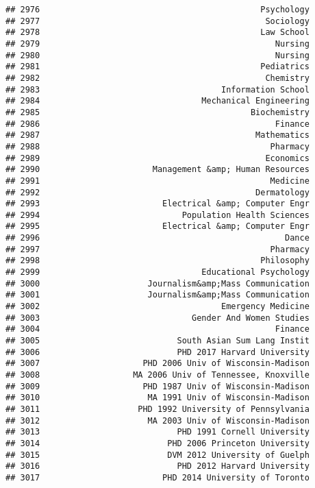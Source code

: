 \documentclass[
]{article}
\begin{document}
\begin{verbatim}
## 2976                                             Psychology
## 2977                                              Sociology
## 2978                                             Law School
## 2979                                                Nursing
## 2980                                                Nursing
## 2981                                             Pediatrics
## 2982                                              Chemistry
## 2983                                     Information School
## 2984                                 Mechanical Engineering
## 2985                                           Biochemistry
## 2986                                                Finance
## 2987                                            Mathematics
## 2988                                               Pharmacy
## 2989                                              Economics
## 2990                       Management &amp; Human Resources
## 2991                                               Medicine
## 2992                                            Dermatology
## 2993                         Electrical &amp; Computer Engr
## 2994                             Population Health Sciences
## 2995                         Electrical &amp; Computer Engr
## 2996                                                  Dance
## 2997                                               Pharmacy
## 2998                                             Philosophy
## 2999                                 Educational Psychology
## 3000                      Journalism&amp;Mass Communication
## 3001                      Journalism&amp;Mass Communication
## 3002                                     Emergency Medicine
## 3003                               Gender And Women Studies
## 3004                                                Finance
## 3005                            South Asian Sum Lang Instit
## 3006                            PHD 2017 Harvard University
## 3007                     PHD 2006 Univ of Wisconsin-Madison
## 3008                   MA 2006 Univ of Tennessee, Knoxville
## 3009                     PHD 1987 Univ of Wisconsin-Madison
## 3010                      MA 1991 Univ of Wisconsin-Madison
## 3011                    PHD 1992 University of Pennsylvania
## 3012                      MA 2003 Univ of Wisconsin-Madison
## 3013                            PHD 1991 Cornell University
## 3014                          PHD 2006 Princeton University
## 3015                          DVM 2012 University of Guelph
## 3016                            PHD 2012 Harvard University
## 3017                         PHD 2014 University of Toronto

\end{verbatim}
\end{document}
